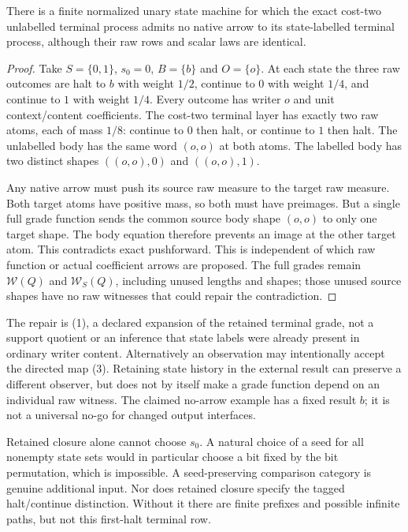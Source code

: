 \documentclass[11pt]{article}
\begin{document}
\begin{proposition}
There is a finite normalized unary state machine for which the exact cost-two unlabelled terminal process admits no native arrow to its state-labelled terminal process, although their raw rows and scalar laws are identical.
\end{proposition}
\begin{proof}
Take $S=\{0,1\}$, $s_0=0$, $B=\{b\}$ and $O=\{o\}$. At each state the three raw outcomes are halt to $b$ with weight $1/2$, continue to $0$ with weight $1/4$, and continue to $1$ with weight $1/4$. Every outcome has writer $o$ and unit context/content coefficients. The cost-two terminal layer has exactly two raw atoms, each of mass $1/8$: continue to $0$ then halt, or continue to $1$ then halt. The unlabelled body has the same word $(o,o)$ at both atoms. The labelled body has two distinct shapes $((o,o),0)$ and $((o,o),1)$.

Any native arrow must push its source raw measure to the target raw measure. Both target atoms have positive mass, so both must have preimages. But a single full grade function sends the common source body shape $(o,o)$ to only one target shape. The body equation therefore prevents an image at the other target atom. This contradicts exact pushforward. This is independent of which raw function or actual coefficient arrows are proposed. The full grades remain $\mathcal W(Q)$ and $\mathcal W_S(Q)$, including unused lengths and shapes; those unused source shapes have no raw witnesses that could repair the contradiction.
\end{proof}

The repair is (1), a declared expansion of the retained terminal grade, not a support quotient or an inference that state labels were already present in ordinary writer content. Alternatively an observation may intentionally accept the directed map (3). Retaining state history in the external result can preserve a different observer, but does not by itself make a grade function depend on an individual raw witness. The claimed no-arrow example has a fixed result $b$; it is not a universal no-go for changed output interfaces.

Retained closure alone cannot choose $s_0$. A natural choice of a seed for all nonempty state sets would in particular choose a bit fixed by the bit permutation, which is impossible. A seed-preserving comparison category is genuine additional input. Nor does retained closure specify the tagged halt/continue distinction. Without it there are finite prefixes and possible infinite paths, but not this first-halt terminal row.
\end{document}
